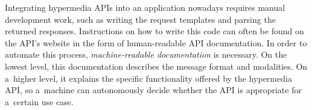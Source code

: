 Integrating hypermedia APIs into an application nowadays requires manual development work,
such as writing the \http request templates
and parsing the returned \http responses.
Instructions on how to write this code can often be found
on the API's website in the form of human-readable API documentation.
In order to automate this process, \emph{machine-readable documentation} is necessary.
On the lowest level, this documentation describes the message format and modalities.
On a~higher level, it explains the specific functionality offered by the hypermedia API,
so a~machine can autonomously decide whether the API is appropriate for a~certain use case.

% 


